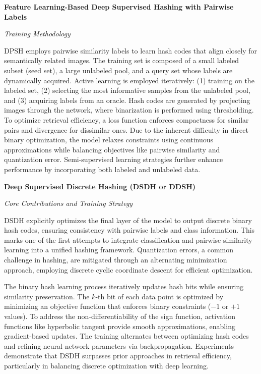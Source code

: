 \textbf{Feature Learning-Based Deep Supervised Hashing with Pairwise Labels}

\textit{Training Methodology}

DPSH employs pairwise similarity labels to learn hash codes that align closely for semantically related images. The training set is composed of a small labeled subset (seed set), a large unlabeled pool, and a query set whose labels are dynamically acquired. Active learning is employed iteratively: (1) training on the labeled set, (2) selecting the most informative samples from the unlabeled pool, and (3) acquiring labels from an oracle. Hash codes are generated by projecting images through the network, where binarization is performed using thresholding. To optimize retrieval efficiency, a loss function enforces compactness for similar pairs and divergence for dissimilar ones. Due to the inherent difficulty in direct binary optimization, the model relaxes constraints using continuous approximations while balancing objectives like pairwise similarity and quantization error. Semi-supervised learning strategies further enhance performance by incorporating both labeled and unlabeled data.\cite{li2016featurelearningbaseddeep}

\textbf{Deep Supervised Discrete Hashing (DSDH or DDSH)}

\textit{Core Contributions and Training Strategy}

DSDH explicitly optimizes the final layer of the model to output discrete binary hash codes, ensuring consistency with pairwise labels and class information. This marks one of the first attempts to integrate classification and pairwise similarity learning into a unified hashing framework. Quantization errors, a common challenge in hashing, are mitigated through an alternating minimization approach, employing discrete cyclic coordinate descent for efficient optimization.

The binary hash learning process iteratively updates hash bits while ensuring similarity preservation. The $k$-th bit of each data point is optimized by minimizing an objective function that enforces binary constraints ($-1$ or $+1$ values). To address the non-differentiability of the sign function, activation functions like hyperbolic tangent provide smooth approximations, enabling gradient-based updates. The training alternates between optimizing hash codes and refining neural network parameters via backpropagation. Experiments demonstrate that DSDH surpasses prior approaches in retrieval efficiency, particularly in balancing discrete optimization with deep learning.\cite{10.5555/3294996.3295009}

